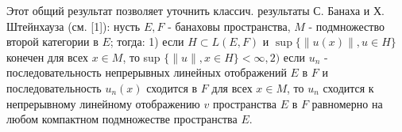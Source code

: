 \documentclass[10pt]{article}
\begin{document}
Этот общий результат позволяет уточнить классич. результаты С. Банаха и Х. Штейнхауза (см. [1]): нусть $E, F$ - банаховы пространства, $M$ - подмножество второй категории в $E$; тогда: 1) если $H \subset L(E, F)$ и $\sup \{\|u(x)\|, u \in H\}$ конечен для всех $x \in M$, то sup $\{\|u\|, x \in H\}<\infty, 2)$ если $u_{n}$ - последовательность непрерывных линейных отображений $E$ в $F$ и последовательность $u_{n}(x)$ сходится в $F$ для всех $x \in M$, то $u_{n}$ сходится к непрерывному линейному отображению $v$ пространства $E$ в $F$ равномерно на любом компактном подмножестве пространства $E$.
\end{document}
